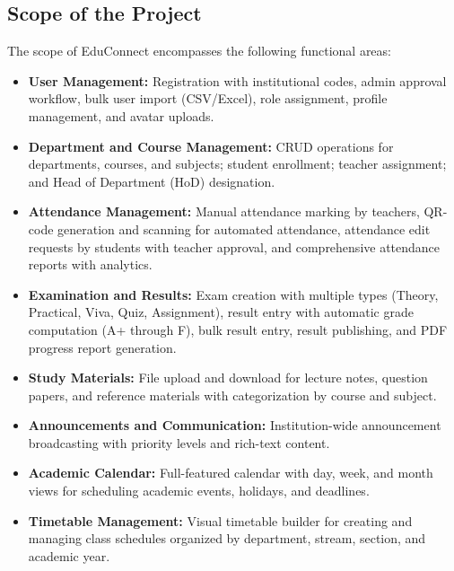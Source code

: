 \subsection{Scope of the Project}

The scope of EduConnect encompasses the following functional areas:

\begin{itemize}[leftmargin=2em]
    \item \textbf{User Management:} Registration with institutional codes, admin approval workflow, bulk user import (CSV/Excel), role assignment, profile management, and avatar uploads.
    
    \item \textbf{Department and Course Management:} CRUD operations for departments, courses, and subjects; student enrollment; teacher assignment; and Head of Department (HoD) designation.
    
    \item \textbf{Attendance Management:} Manual attendance marking by teachers, QR-code generation and scanning for automated attendance, attendance edit requests by students with teacher approval, and comprehensive attendance reports with analytics.
    
    \item \textbf{Examination and Results:} Exam creation with multiple types (Theory, Practical, Viva, Quiz, Assignment), result entry with automatic grade computation (A+ through F), bulk result entry, result publishing, and PDF progress report generation.
    
    \item \textbf{Study Materials:} File upload and download for lecture notes, question papers, and reference materials with categorization by course and subject.
    
    \item \textbf{Announcements and Communication:} Institution-wide announcement broadcasting with priority levels and rich-text content.
    
    \item \textbf{Academic Calendar:} Full-featured calendar with day, week, and month views for scheduling academic events, holidays, and deadlines.
    
    \item \textbf{Timetable Management:} Visual timetable builder for creating and managing class schedules organized by department, stream, section, and academic year.
    

\end{itemize}
